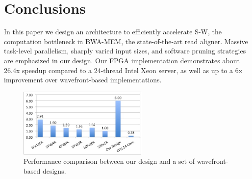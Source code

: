\section{Conclusions} 
\label{sec:conclusions}
In this paper we design an architecture to efficiently accelerate S-W, the computation bottleneck in BWA-MEM, the state-of-the-art read aligner. 
Massive task-level parallelism, sharply varied input sizes, and software pruning strategies are emphasized in our design. 
Our FPGA implementation demonstrates about 26.4x speedup compared to a 24-thread Intel Xeon server, as well as up to a 6x improvement over wavefront-based implementations. 

\begin{figure}[!hbt]
	\begin{center}
		\includegraphics[width=2.5in]{Figures/F2C5.jpg}
		\caption {Performance comparison between our design and a set of wavefront-based designs.}
		\label{fig:F2C5}
	\end{center}
\end{figure}
\vspace{-10pt}

